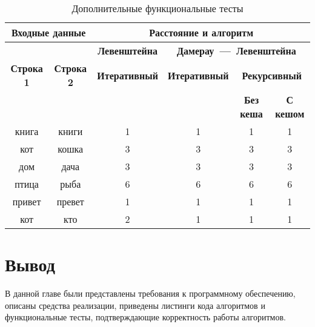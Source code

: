 \begin{table}[ht]
	\small
	\begin{center}
		\begin{threeparttable}
		\caption{Дополнительные функциональные тесты}
		\label{tbl:additional_func_tests}
		\begin{tabular}{|c|c|c|c|c|c|}
			\hline
			\multicolumn{2}{|c|}{\bfseries Входные данные}
			& \multicolumn{4}{c|}{\bfseries Расстояние и алгоритм} \\ 
			\hline 
			&
			& \multicolumn{1}{c|}{\bfseries Левенштейна} 
			& \multicolumn{3}{c|}{\bfseries Дамерау~---~Левенштейна} \\ \cline{3-6}
			
			\bfseries Строка 1 & \bfseries Строка 2 & \bfseries Итеративный & \bfseries Итеративный
			
			& \multicolumn{2}{c|}{\bfseries Рекурсивный} \\ \cline{5-6}
			& & & & \bfseries Без кеша & \bfseries С кешом \\
			\hline
			книга & книги & 1 & 1 & 1 & 1 \\
			\hline
			кот & кошка & 3 & 3 & 3 & 3 \\
			\hline
			дом & дача & 3 & 3 & 3 & 3 \\
			\hline
			птица & рыба & 6 & 6 & 6 & 6 \\
			\hline
			привет & превет & 1 & 1 & 1 & 1 \\
			\hline
			кот & кто & 2 & 1 & 1 & 1 \\
			\hline
		\end{tabular}	
		\end{threeparttable}
	\end{center}
\end{table}


\section*{Вывод}

В данной главе были представлены требования к программному обеспечению, описаны средства реализации, приведены листинги кода алгоритмов и функциональные тесты, подтверждающие корректность работы алгоритмов.
